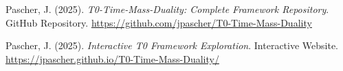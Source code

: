 \documentclass{article}
\begin{document}
\begin{thebibliography}{99}
		
		Pascher, J. (2025).
		\textit{T0-Time-Mass-Duality: Complete Framework Repository}.
		GitHub Repository.
		\url{https://github.com/jpascher/T0-Time-Mass-Duality}
		
		Pascher, J. (2025).
		\textit{Interactive T0 Framework Exploration}.
		Interactive Website.
		\url{https://jpascher.github.io/T0-Time-Mass-Duality/}
		
	\end{thebibliography}
	
\end{document}

